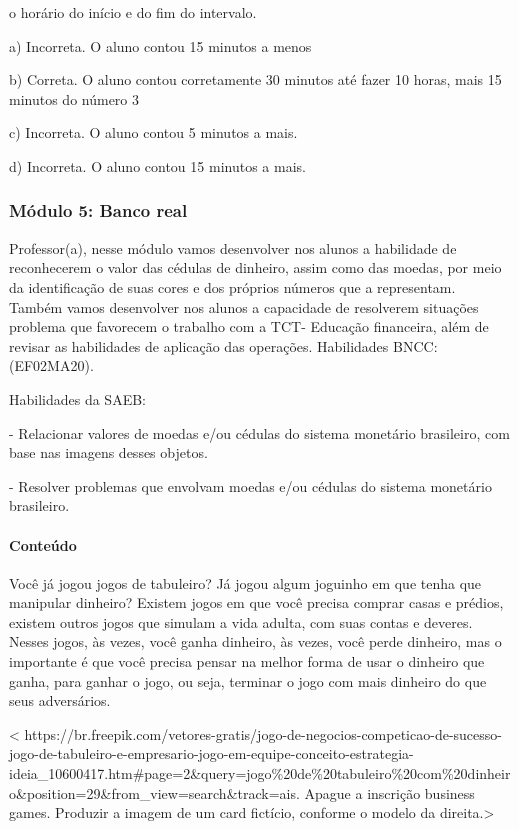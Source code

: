 o horário do início e do fim do intervalo.

a) Incorreta. O aluno contou 15 minutos a menos

b) Correta. O aluno contou corretamente 30 minutos até fazer 10 horas,
mais 15 minutos do número 3

c) Incorreta. O aluno contou 5 minutos a mais.

d) Incorreta. O aluno contou 15 minutos a mais.

\subsubsection{Módulo 5: Banco real }\label{muxf3dulo-5-banco-real}

Professor(a), nesse módulo vamos desenvolver nos alunos a habilidade de
reconhecerem o valor das cédulas de dinheiro, assim como das moedas, por
meio da identificação de suas cores e dos próprios números que a
representam. Também vamos desenvolver nos alunos a capacidade de
resolverem situações problema que favorecem o trabalho com a TCT-
Educação financeira, além de revisar as habilidades de aplicação das
operações. Habilidades BNCC: (EF02MA20).

Habilidades da SAEB:

- Relacionar valores de moedas e/ou cédulas do sistema monetário
brasileiro, com base nas imagens desses objetos.

- Resolver problemas que envolvam moedas e/ou cédulas do sistema
monetário brasileiro.

\paragraph{Conteúdo}\label{conteuxfado-4}

Você já jogou jogos de tabuleiro? Já jogou algum joguinho em que tenha
que manipular dinheiro? Existem jogos em que você precisa comprar casas
e prédios, existem outros jogos que simulam a vida adulta, com suas
contas e deveres. Nesses jogos, às vezes, você ganha dinheiro, às vezes,
você perde dinheiro, mas o importante é que você precisa pensar na
melhor forma de usar o dinheiro que ganha, para ganhar o jogo, ou seja,
terminar o jogo com mais dinheiro do que seus adversários.

\textless{}
https://br.freepik.com/vetores-gratis/jogo-de-negocios-competicao-de-sucesso-jogo-de-tabuleiro-e-empresario-jogo-em-equipe-conceito-estrategia-ideia\_10600417.htm\#page=2\&query=jogo\%20de\%20tabuleiro\%20com\%20dinheiro\&position=29\&from\_view=search\&track=ais.
Apague a inscrição business games. Produzir a imagem de um card
fictício, conforme o modelo da direita.\textgreater{}

